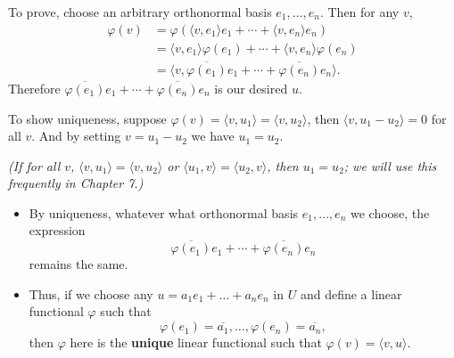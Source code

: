 \documentclass[11pt]{article}
\newcommand{\conj}[1]{\overline{#1}}
\newcommand{\inp}[2]{\langle #1, #2 \rangle}
\renewcommand{\phi}{\varphi}
\begin{document}
\begin{itemize}
    To prove, choose an arbitrary orthonormal basis $e_1,\dots,e_n$. Then for any $v$,
    \begin{align*}
        \phi(v) & = \phi(\inp{v}{e_1}e_1+\cdots+\inp{v}{e_n}e_n) \\ & = \inp{v}{e_1}\phi(e_1)+\cdots+\inp{v}{e_n}\phi(e_n) \\ & = \inp{v}{\conj{\phi(e_1)}e_1+\cdots+\conj{\phi(e_n)}e_n}.
    \end{align*}
    Therefore $\conj{\phi(e_1)}e_1+\cdots+\conj{\phi(e_n)}e_n$ is our desired $u$.
    
    To show uniqueness, suppose $\phi(v) = \inp{v}{u_1} = \inp{v}{u_2}$, then $\inp{v}{u_1 - u_2} = 0$ for all $v$. And by setting $v = u_1 - u_2$ we have $u_1 = u_2$.
    
    \emph{(If for all $v$, $\inp{v}{u_1} = \inp{v}{u_2}$ or $\inp{u_1}{v} = \inp{u_2}{v}$, then $u_1 = u_2$; we will use this frequently in Chapter 7.)}
    \begin{itemize}
        \item By uniqueness, whatever what orthonormal basis $e_1,\dots,e_n$ we choose, the expression $$\conj{\phi(e_1)}e_1+\cdots+\conj{\phi(e_n)}e_n$$ remains the same.
        \item Thus, if we choose any $u = a_1 e_1 + \dots + a_n e_n$ in $U$ and define a linear functional $\phi$ such that $$\phi(e_1)=\conj{a_1},\dots,\phi(e_n)=\conj{a_n},$$ then $\phi$ here is the \textbf{unique} linear functional such that $\phi(v) = \inp{v}{u}$.
    \end{itemize}
\end{itemize}
\end{document}
